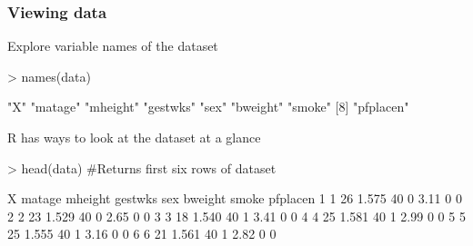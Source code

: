 \documentclass{beamer}
\begin{document}
\begin{frame}[fragile]\frametitle{Viewing data}
\small
Explore variable names of the dataset
\begin{Schunk}
\begin{Sinput}
> names(data) 
\end{Sinput}
\begin{Soutput}
[1] "X"        "matage"   "mheight"  "gestwks"  "sex"      "bweight"  "smoke"   
[8] "pfplacen"
\end{Soutput}
\end{Schunk}
R has ways to look at the dataset at a glance
\begin{Schunk}
\begin{Sinput}
> head(data) #Returns first six rows of dataset
\end{Sinput}
\begin{Soutput}
  X matage mheight gestwks sex bweight smoke pfplacen
1 1     26   1.575      40   0    3.11     0        0
2 2     23   1.529      40   0    2.65     0        0
3 3     18   1.540      40   1    3.41     0        0
4 4     25   1.581      40   1    2.99     0        0
5 5     25   1.555      40   1    3.16     0        0
6 6     21   1.561      40   1    2.82     0        0
\end{Soutput}
\end{Schunk}
\end{frame}
\end{document}
